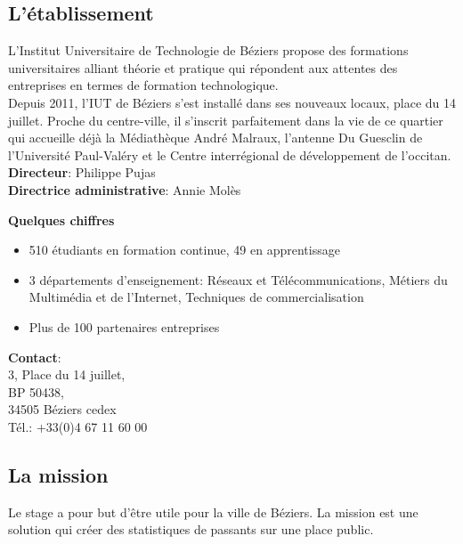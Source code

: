 \documentclass[12pt, french]{report}
\begin{document}
\subsection*{L'établissement}

L'Institut Universitaire de Technologie de Béziers propose des formations universitaires alliant théorie et pratique qui répondent aux attentes des entreprises en termes de formation technologique. \\

Depuis 2011, l’IUT de Béziers s’est installé dans ses nouveaux locaux, place du 14 juillet. Proche du centre-ville, il s’inscrit parfaitement dans la vie de ce quartier qui accueille déjà la Médiathèque André Malraux, l’antenne Du Guesclin de l’Université Paul-Valéry et le Centre interrégional de développement de l’occitan.\\

\textbf{Directeur}: Philippe Pujas\\

\textbf{Directrice administrative}: Annie Molès\\
\bigskip

\textbf{Quelques chiffres}\\
\begin{itemize}
        \item 510 étudiants en formation continue, 49 en apprentissage
        \item 3 départements d'enseignement: Réseaux et Télécommunications, Métiers du Multimédia et de l'Internet, Techniques de commercialisation
        \item Plus de 100 partenaires entreprises\\
\end{itemize} 


\textbf{Contact}:\\ 3, Place du 14 juillet,\\ BP 50438,\\ 34505 Béziers cedex\\ Tél.: +33(0)4 67 11 60 00


\subsection*{La mission}
    
Le stage a pour but d'être utile pour la ville de Béziers. La mission est une solution qui créer des statistiques de passants sur une place public. \\
\end{document}
